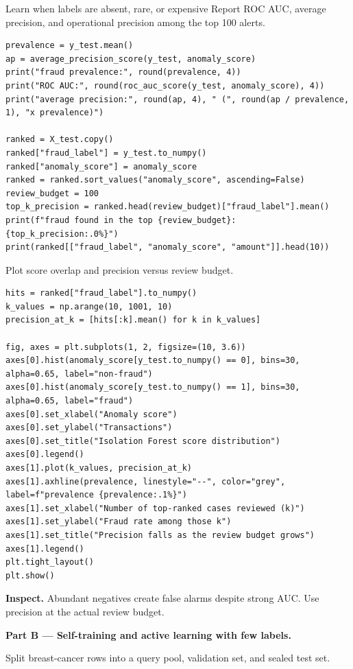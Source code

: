 \begin{labproject}{Learn when labels are absent, rare, or expensive}
Report ROC AUC, average precision, and operational precision among the top 100 alerts.

\begin{lstlisting}[style=utppython]
prevalence = y_test.mean()
ap = average_precision_score(y_test, anomaly_score)
print("fraud prevalence:", round(prevalence, 4))
print("ROC AUC:", round(roc_auc_score(y_test, anomaly_score), 4))
print("average precision:", round(ap, 4), " (", round(ap / prevalence, 1), "x prevalence)")

ranked = X_test.copy()
ranked["fraud_label"] = y_test.to_numpy()
ranked["anomaly_score"] = anomaly_score
ranked = ranked.sort_values("anomaly_score", ascending=False)
review_budget = 100
top_k_precision = ranked.head(review_budget)["fraud_label"].mean()
print(f"fraud found in the top {review_budget}: {top_k_precision:.0%}")
print(ranked[["fraud_label", "anomaly_score", "amount"]].head(10))
\end{lstlisting}

Plot score overlap and precision versus review budget.

\begin{lstlisting}[style=utppython]
hits = ranked["fraud_label"].to_numpy()
k_values = np.arange(10, 1001, 10)
precision_at_k = [hits[:k].mean() for k in k_values]

fig, axes = plt.subplots(1, 2, figsize=(10, 3.6))
axes[0].hist(anomaly_score[y_test.to_numpy() == 0], bins=30, alpha=0.65, label="non-fraud")
axes[0].hist(anomaly_score[y_test.to_numpy() == 1], bins=30, alpha=0.65, label="fraud")
axes[0].set_xlabel("Anomaly score")
axes[0].set_ylabel("Transactions")
axes[0].set_title("Isolation Forest score distribution")
axes[0].legend()
axes[1].plot(k_values, precision_at_k)
axes[1].axhline(prevalence, linestyle="--", color="grey", label=f"prevalence {prevalence:.1%}")
axes[1].set_xlabel("Number of top-ranked cases reviewed (k)")
axes[1].set_ylabel("Fraud rate among those k")
axes[1].set_title("Precision falls as the review budget grows")
axes[1].legend()
plt.tight_layout()
plt.show()
\end{lstlisting}

\textbf{Inspect.} Abundant negatives create false alarms despite strong AUC. Use precision at the actual review budget.

\medskip\noindent\textbf{Part B --- Self-training and active learning with few labels.}\par

Split breast-cancer rows into a query pool, validation set, and sealed test set.


\end{labproject}

